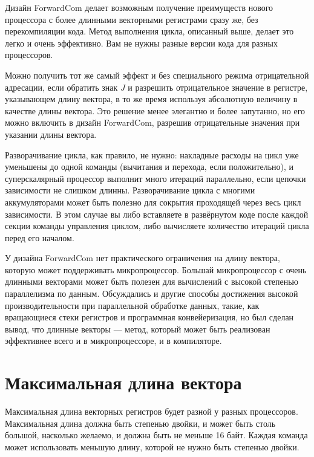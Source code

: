 \documentclass[forwardcom.tex]{subfiles}
\begin{document}
Дизайн ForwardCom делает возможным получение преимуществ нового процессора с более длинными векторными регистрами сразу же, без перекомпиляции кода. Метод выполнения цикла, описанный выше, делает это легко и очень эффективно. Вам  не нужны разные версии кода для разных процессоров.

Можно получить тот же самый эффект и без специального режима отрицательной адресации, если обратить знак $J$ и разрешить отрицательное значение в регистре, указывающем длину вектора, в то же время используя абсолютную величину в качестве длины вектора. Это решение менее элегантно и более запутанно, но его можно включить в дизайн ForwardCom, разрешив отрицательные значения при указании длины вектора.

Разворачивание цикла, как правило, не нужно:  накладные расходы на цикл уже уменьшены до одной команды (вычитания и перехода, если положительно), и суперскалярный процессор выполнит много итераций параллельно, если цепочки зависимости не слишком длинны. Разворачивание цикла с многими аккумуляторами может быть полезно для сокрытия проходящей через весь цикл зависимости. В этом случае вы либо вставляете в развёрнутом коде после каждой секции команды управления циклом, либо вычисляете количество итераций цикла перед его началом.

У дизайна ForwardCom нет практического ограничения на длину вектора, которую может поддерживать микропроцессор. Большай микропроцессор с очень длинными векторами может быть полезен для вычислений с высокой степенью параллелизма по данным. Обсуждались и другие способы достижения высокой производительности при параллельной обработке данных, такие, как вращающиеся стеки регистров и программная конвейеризация, но был сделан вывод, что длинные векторы --- метод, который может быть реализован эффективнее всего и в микропроцессоре, и в компиляторе.

\section{Максимальная длина вектора}
Максимальная длина векторных регистров будет разной у разных процессоров. Максимальная длина должна быть степенью двойки, и может быть столь большой, насколько желаемо, и должна быть не меньше 16 байт. Каждая команда может использовать меньшую длину, которой не нужно быть степенью двойки.
\end{document}
